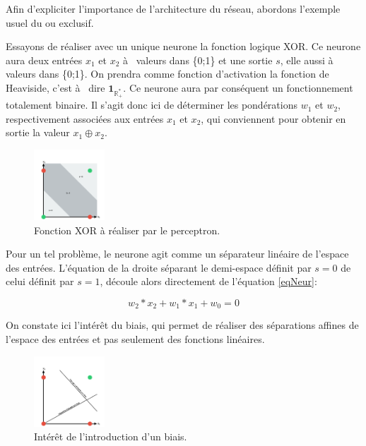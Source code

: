 \documentclass[a4paper,twoside]{report}
\begin{document}
                Afin d'expliciter l'importance de l'architecture du réseau, abordons l'exemple usuel du ou exclusif.

                Essayons de réaliser avec un unique neurone la fonction logique XOR. Ce neurone aura deux entrées $x_{1}$ et $x_{2}$ à  valeurs dans \{0;1\} et une sortie $s$, elle aussi à  valeurs dans \{0;1\}. On prendra comme fonction d'activation la fonction de Heaviside, c'est à  dire $\mathbf{1}_{\mathbb{R}^{*}_{+}}$. Ce neurone aura par conséquent un fonctionnement totalement binaire. Il s'agit donc ici de déterminer les pondérations $w_{1}$ et $w_{2}$, respectivement associées aux entrées $x_{1}$ et $x_{2}$, qui conviennent pour obtenir en sortie la valeur $x_{1}\oplus x_{2}$.\\

                \begin{figure}
                    \begin{center}
                        \includegraphics[width=100px]{Images/xor-01.png}
                    \end{center}
                    \caption{Fonction XOR à réaliser par le perceptron.}
                \end{figure}

                Pour un tel problème, le neurone agit comme un séparateur linéaire de l'espace des entrées. L'équation de la droite séparant le demi-espace définit par $s=0$ de celui définit par $s=1$, découle alors directement de l'équation \ref{eqNeur}:

                \begin{equation}w_{2}*x_{2}+w_{1}*x_{1}+w_{0}=0\end{equation}

                On constate ici l'intérêt du biais, qui permet de réaliser des séparations affines de l'espace des entrées et pas seulement des fonctions linéaires.

                \begin{figure}
                    \begin{center}
                        \includegraphics[width=100px]{Images/biais-01.png}
                    \end{center}
                    \caption{Intérêt de l'introduction d'un biais.}
                \end{figure}
\end{document}
